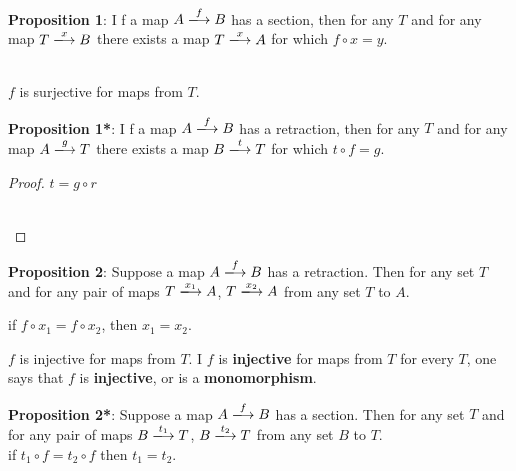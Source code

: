 \documentclass{book}
\begin{document}
\begin{flushleft}
  \textbf{Proposition 1}: I f a map $A \xlongrightarrow{f} B$ has a section,
  then for any $T$ and for any map $T \xlongrightarrow{x} B$ there exists a map
  $T \xlongrightarrow{x} A$ for which $f \circ x = y$.
\end{flushleft}

\\
$f$ is surjective for maps from $T$.

\begin{flushleft}
  \textbf{Proposition 1*}: I f a map $A \xlongrightarrow{f} B$ has a retraction,
  then for any $T$ and for any map $A \xlongrightarrow{g} T$ there exists a map
  $B \xlongrightarrow{t} T$ for which $t \circ f = g$.
\end{flushleft}

\begin{proof}
  $t = g \circ r$\\
\\
\end{proof}

\begin{flushleft}
  \textbf{Proposition 2}: Suppose a map $A \xlongrightarrow{f} B$ has a
  retraction. Then for any set $T$ and for any pair of maps $T
  \xlongrightarrow{x_1} A$, $T \xlongrightarrow{x_2} A$ from any set $T$ to
  $A$.
\end{flushleft}
  if $f \circ x_1 = f \circ x_2$, then $x_1 = x_2$.


  $f$ is injective for maps from $T$.  I $f$ is \textbf{injective} for maps from $T$ for
  every $T$, one says that $f$ is \textbf{injective}, or is a
  \textbf{monomorphism}.

\begin{flushleft}
  \textbf{Proposition 2*}: Suppose a map $A \xlongrightarrow{f} B$ has a
  section. Then for any set $T$ and for any pair of maps $B
  \xlongrightarrow{t_1} T$, $B \xlongrightarrow{t_2} T$ from any set $B$ to
  $T$.\\
  if $t_1 \circ f = t_2 \circ f$ then $t_1 = t_2$.
\end{flushleft}
\end{document}
